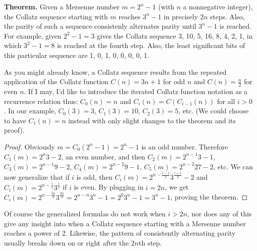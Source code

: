 \documentclass[12pt]{article}
\begin{document}

{\bf Theorem.} Given a Mersenne number $m = 2^n - 1$ (with $n$ a nonnegative integer), the Collatz sequence starting with $m$ reaches $3^n - 1$ in precisely $2n$ steps. Also, the parity of such a sequence consistenly alternates parity until $3^n - 1$ is reached. For example, given $2^2 - 1 = 3$ gives the Collatz sequence 3, 10, 5, 16, 8, 4, 2, 1, in which $3^2 - 1 = 8$ is reached at the fourth step. Also, the least significant bits of this particular sequence are 1, 0, 1, 0, 0, 0, 0, 1.

As you might already know, a Collatz sequence results from the repeated application of the Collatz function $C(n) = 3n + 1$ for odd $n$ and $C(n) = \frac{n}{2}$ for even $n$. If I may, I'd like to introduce the iterated Collatz function notation as a recurrence relation thus: $C_0(n) = n$ and $C_i(n) = C(C_{i - 1}(n))$ for all $i > 0$. In our example, $C_0(3) = 3$, $C_1(3) = 10$, $C_2(3) = 5$, etc. (We could choose to have $C_1(n) = n$ instead with only slight changes to the theorem and its proof).

\begin{proof}
Obviously $m = C_0(2^n - 1) = 2^n - 1$ is an odd number. Therefore $C_1(m) = 2^n 3 - 2$, an even number, and then $C_2(m) = 2^{n - 1} 3 - 1$, $C_3(m) = 2^{n - 1} 9 - 2$, $C_4(m) = 2^{n - 2} 9 - 1$, $C_5(m) = 2^{n - 2} 27 - 2$, etc. We can now generalize that if $i$ is odd, then $C_i(m) = 2^{n - \frac{i - 1}{2}} 3^{\frac{i + 1}{2}} - 2$ and $C_i(m) = 2^{n - \frac{i}{2}} 3^{\frac{i}{2}}$ if $i$ is even. By plugging in $i = 2n$, we get $C_i(m) = 2^{n - \frac{2n}{2}} 3^{\frac{2n}{2}} = 2^{n - n} 3^n - 1 = 2^0 3^n - 1 = 3^n - 1$, proving the theorem.
\end{proof}

Of course the generalized formulas do not work when $i > 2n$, nor does any of this give any insight into when a Collatz sequence starting with a Mersenne number reaches a power of 2. Likewise, the pattern of consistently alternating parity usually breaks down on or right after the $2n$th step.
\end{document}

